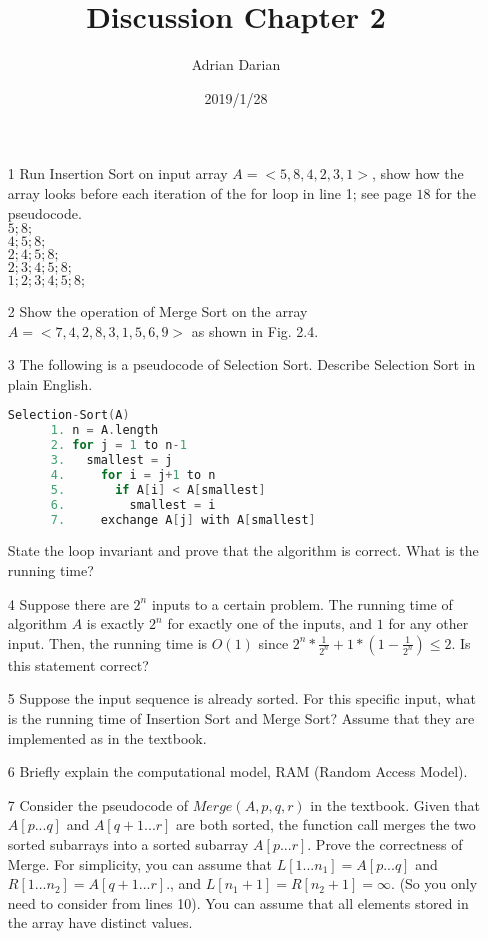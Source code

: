 \documentclass[a4paper]{article}
\title{Discussion Chapter 2}
\author{Adrian Darian}
\date{2019/1/28}
\newcommand\tab[1][0.5cm]{\hspace*{#1}}
\begin{document}
  
  \maketitle

  \begin{itemize}
    \item[1] Run Insertion Sort on input array $A = <5, 8, 4, 2, 3, 1>$, show how the array looks before each iteration of the for loop in line 1; see page $18$ for the pseudocode. \\
    \tab $5;8;$ \\
    \tab $4;5;8;$ \\
    \tab $2;4;5;8;$ \\
    \tab $2;3;4;5;8;$ \\
    \tab $1;2;3;4;5;8;$ 
    \item[2] Show the operation of Merge Sort on the array $A = <7, 4, 2, 8, 3, 1, 5, 6, 9>$ as shown in Fig. 2.4.
    \tab 
    \item[3] The following is a pseudocode of Selection Sort. Describe Selection Sort in plain English. \\
    \begin{lstlisting}[language=c++]
      Selection-Sort(A) 
      1. n = A.length 
      2. for j = 1 to n-1 
      3.   smallest = j 
      4.     for i = j+1 to n 
      5.       if A[i] < A[smallest] 
      6.         smallest = i 
      7.     exchange A[j] with A[smallest] 
    \end{lstlisting}
    State the loop invariant and prove that the algorithm is correct. What is the running time?
    \item[4] Suppose there are $2^n$ inputs to a certain problem. The running time of algorithm $A$ is exactly $2^n$ for exactly one of the inputs, and $1$ for any other input. Then, the running time is $O(1)$ since $2^n * \frac{1}{2^n} + 1 * (1 - \frac{1}{2^n}) \leq 2$. Is this statement correct?
    \item[5] Suppose the input sequence is already sorted. For this specific input, what is the running time of Insertion Sort and Merge Sort? Assume that they are implemented as in the textbook.
    \item[6] Briefly explain the computational model, RAM (Random Access Model).
    \item[7] Consider the pseudocode of $Merge(A, p, q, r)$ in the textbook. Given that $A[p...q]$ and $A[q + 1...r]$ are both sorted, the function call merges the two sorted subarrays into a sorted subarray $A[p...r]$. Prove the correctness of Merge. For simplicity, you can assume that $L[1...n_{1}] = A[p...q]$ and $R[1...n_{2}] = A[q + 1...r]$., and $L[n_{1} + 1] = R[n_{2} + 1] = \infty$. (So you only need to consider from lines 10). You can assume that all elements stored in the array have distinct values.

\end{itemize}
\end{document}

